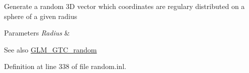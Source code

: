 Generate a random 3D vector which coordinates are regulary distributed on a sphere of a given radius


\begin{DoxyParams}{Parameters}
{\em Radius} & \\
\hline
\end{DoxyParams}
\begin{DoxySeeAlso}{See also}
\mbox{\hyperlink{group__gtc__random}{G\+L\+M\+\_\+\+G\+T\+C\+\_\+random}} 
\end{DoxySeeAlso}


Definition at line 338 of file random.\+inl.

